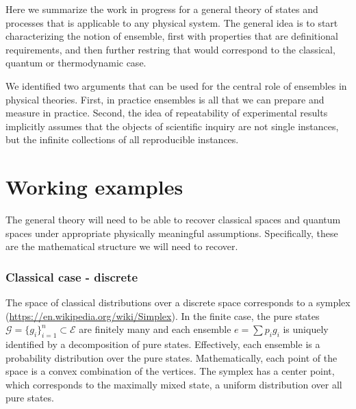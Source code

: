 
\def\>{\rangle}
\def\<{\langle}

\newcommand\mix{\mathrm{mix}}
\newcommand\component{\mathrm{comp}}
\newcommand\cospan{\mathrm{cospan}}

\newcommand{\ens}[1][e] {\mathsf{#1}} %
\newcommand{\Ens}[1][E] {\mathcal{#1}} %



Here we summarize the work in progress for a general theory of states and processes that is applicable to any physical system. The general idea is to start characterizing the notion of ensemble, first with properties that are definitional requirements, and then further restring that would correspond to the classical, quantum or thermodynamic case.

We identified two arguments that can be used for the central role of ensembles in physical theories. First, in practice ensembles is all that we can prepare and measure in practice. Second, the idea of repeatability of experimental results implicitly assumes that the objects of scientific inquiry are not single instances, but the infinite collections of all reproducible instances.

\section{Working examples}

The general theory will need to be able to recover classical spaces and quantum spaces under appropriate physically meaningful assumptions. Specifically, these are the mathematical structure we will need to recover.


\subsubsection{Classical case - discrete}

The space of classical distributions over a discrete space corresponds to a symplex (\url{https://en.wikipedia.org/wiki/Simplex}). In the finite case, the pure states $\mathcal{G} = \{g_i\}_{i=1}^{n} \subset \Ens$ are finitely many and each ensemble $e = \sum p_i g_i$ is uniquely identified by a decomposition of pure states. Effectively, each ensemble is a probability distribution over the pure states. Mathematically, each point of the space is a convex combination of the vertices. The symplex has a center point, which corresponds to the maximally mixed state, a uniform distribution over all pure states.

